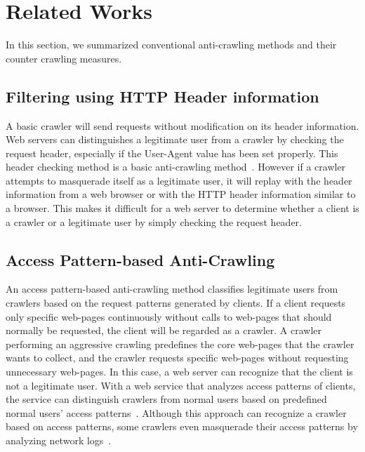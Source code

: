 \documentclass[sigconf,review]{acmart}
\begin{document}
%
%
\section{Related Works}
In this section, we summarized conventional anti-crawling methods and their counter crawling measures.

\subsection{Filtering using HTTP Header information} 
A basic crawler will send requests without modification on its header information. Web servers can distinguishes a legitimate user from a crawler by checking the request header, especially if the User-Agent value has been set properly. This header checking method is a basic anti-crawling method~\cite{r10}.
However if a crawler attempts to masquerade itself as a legitimate user, it will replay with the header information from a web browser or with the HTTP header information similar to a browser. This makes it difficult for a web server to determine whether a client is a crawler or a legitimate user by simply checking the request header.

\subsection{Access Pattern-based Anti-Crawling}
An access pattern-based anti-crawling method classifies legitimate users from crawlers based on the request patterns generated by clients. If a client requests only specific web-pages continuously without calls to web-pages that should normally be requested, the client will be regarded as a crawler. A crawler performing an aggressive crawling predefines the core web-pages that the crawler wants to collect, and the crawler requests specific web-pages without requesting unnecessary web-pages. In this case, a web server can recognize that the client is not a legitimate user. With a web service that analyzes access patterns of clients, the service can distinguish crawlers from normal users based on predefined normal users' access patterns~\cite{r10}. Although this approach can recognize a crawler based on access patterns, some crawlers even masquerade their access patterns by analyzing network logs~\cite{r14}.
\end{document}
